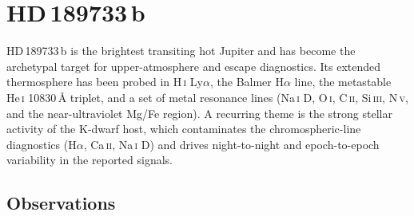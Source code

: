 \section{HD\,189733\,b}
\label{sec:hd189733b}

HD\,189733\,b is the brightest transiting hot Jupiter and has become the
archetypal target for upper-atmosphere and escape diagnostics. Its extended
thermosphere has been probed in H\,\textsc{i} Ly$\alpha$, the Balmer
H$\alpha$ line, the metastable He\,\textsc{i} 10830\,\AA{} triplet, and a set
of metal resonance lines (Na\,\textsc{i} D, O\,\textsc{i}, C\,\textsc{ii},
Si\,\textsc{iii}, N\,\textsc{v}, and the near-ultraviolet Mg/Fe region).
A recurring theme is the strong stellar activity of the K-dwarf host, which
contaminates the chromospheric-line diagnostics (H$\alpha$, Ca\,\textsc{ii},
Na\,\textsc{i} D) and drives night-to-night and epoch-to-epoch variability in
the reported signals.

\subsection{Observations}

